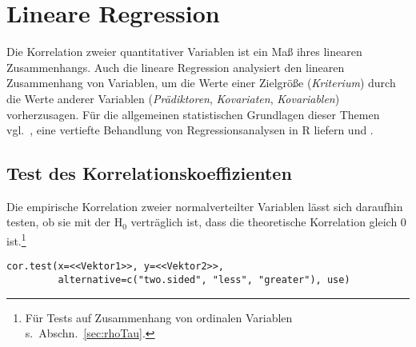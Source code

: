 \chapter{Lineare Regression}
\label{sec:regression}

Die Korrelation zweier quantitativer Variablen ist ein Maß ihres linearen Zusammenhangs. Auch die lineare Regression analysiert den linearen Zusammenhang von Variablen, um die Werte einer Zielgröße (\emph{Kriterium}) durch die Werte anderer Variablen (\emph{Prädiktoren}, \emph{Kovariaten}, \emph{Kovariablen}) vorherzusagen. Für die allgemeinen statistischen Grundlagen dieser Themen vgl.\ , eine vertiefte Behandlung von Regressionsanalysen in R liefern  und .

\section{Test des Korrelationskoeffizienten}
\label{sec:corTest}

Die empirische Korrelation zweier normalverteilter Variablen lässt sich daraufhin testen, ob sie mit der $\text{H}_{0}$ verträglich ist, dass die theoretische Korrelation gleich $0$ ist.\footnote{Für Tests auf Zusammenhang von ordinalen Variablen s.\ Abschn.\ \ref{sec:rhoTau}.}
\begin{lstlisting}
cor.test(x=<<Vektor1>>, y=<<Vektor2>>,
         alternative=c("two.sided", "less", "greater"), use)
\end{lstlisting}

